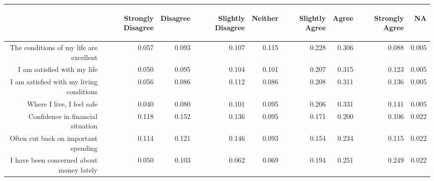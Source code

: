 \documentclass{article}\usepackage[]{graphicx}\usepackage[]{color}
\begin{document}
\begin{table}[ht]
\centering
\begin{tabular}{rrrrrrrrr}
  \hline
 & \begin{sideways} Strongly Disagree \end{sideways} & \begin{sideways} Disagree \end{sideways} & \begin{sideways} Slightly Disagree \end{sideways} & \begin{sideways} Neither \end{sideways} & \begin{sideways} Slightly Agree \end{sideways} & \begin{sideways} Agree \end{sideways} & \begin{sideways} Strongly Agree \end{sideways} & \begin{sideways} NA \end{sideways} \\ 
  \hline
The conditions of my life are excellent & 0.057 & 0.093 & 0.107 & 0.115 & 0.228 & 0.306 & 0.088 & 0.005 \\ 
  I am satisfied with my life & 0.050 & 0.095 & 0.104 & 0.101 & 0.207 & 0.315 & 0.123 & 0.005 \\ 
  I am satisfied with my living conditions & 0.056 & 0.086 & 0.112 & 0.086 & 0.208 & 0.311 & 0.136 & 0.005 \\ 
  Where I live, I feel safe & 0.040 & 0.080 & 0.101 & 0.095 & 0.206 & 0.331 & 0.141 & 0.005 \\ 
  Confidence in financial situation & 0.118 & 0.152 & 0.136 & 0.095 & 0.171 & 0.200 & 0.106 & 0.022 \\ 
  Often cut back on important spending & 0.114 & 0.121 & 0.146 & 0.093 & 0.154 & 0.234 & 0.115 & 0.022 \\ 
  I have been concerned about money lately & 0.050 & 0.103 & 0.062 & 0.069 & 0.194 & 0.251 & 0.249 & 0.022 \\ 
   \hline
\end{tabular}
\end{table}
\end{document}
